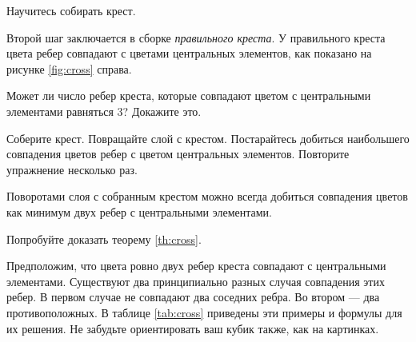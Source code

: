 \begin{exercise}
    Научитесь собирать крест.
\end{exercise}

Второй шаг заключается в сборке \emph{правильного креста}.
У правильного креста цвета ребер совпадают с цветами центральных элементов, как показано на рисунке \ref{fig:cross} справа.


\begin{exercise}
    Может ли число ребер креста, которые совпадают цветом с центральными элементами равняться 3?
    Докажите это.
\end{exercise}

\begin{exercise}
    Соберите крест.
    Повращайте слой с крестом.
    Постарайтесь добиться наибольшего совпадения цветов ребер с цветом центральных элементов.
    Повторите упражнение несколько раз.
\end{exercise}

\begin{theorem}\label{th:cross}
    Поворотами слоя с собранным крестом можно всегда добиться совпадения цветов как минимум двух ребер с центральными элементами.
\end{theorem}
\iffalse
    \ifdef{\ANSWERS}{
        \begin{proof}
            Довернем слой с крестом так, чтобы совпадал хотя бы одного ребра с цветом центра (очевидно, что так сделать можно).
            Возможно два варианта: либо после поворота уже совпадает минимум два ребра, либо совпадает ровно одно.
            В первом случае теорема выполнена.
            Рассмотрим второй случай.
        \end{proof}
    }{}
\fi

\begin{exercise}
    Попробуйте доказать теорему \ref{th:cross}.
\end{exercise}


Предположим, что цвета ровно двух ребер креста совпадают с центральными элементами.
Существуют два принципиально разных случая совпадения этих ребер.
В первом случае не совпадают два соседних ребра.
Во втором --- два противоположных.
В таблице \ref{tab:cross} приведены эти примеры и формулы для их решения.
Не забудьте ориентировать ваш кубик также, как на картинках.

